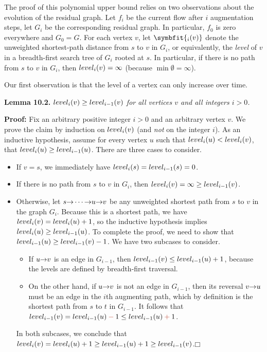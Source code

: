 The proof of this polynomial upper bound relies on two observations about the evolution of the residual graph.
Let $f_i$ be the current flow after $i$ augmentation steps, let $G_i$ be the corresponding residual graph.
In particular, $f_0$ is zero everywhere and $G_0 = G$.
For each vertex $v$, let \textbf{}$\symbfit{{}_i(v)}$ denote the unweighted shortest-path distance from $s$ to $v$ in $G_i$, or equivalently, the \textit{level} of $v$ in a breadth-first search tree of $G_i$ rooted at $s$.
In particular, if there is no path from $s$ to $v$ in $G_i$, then $level_i(v) = \infty$ (because $\min \emptyset = \infty$).

Our first observation is that the level of a vertex can only increase over time.

\noindent\textbf{Lemma 10.2.} \textsl{$level_i(v) \ge level_{i-1}(v)$ for all vertices $v$ and all integers $i > 0$.}

\noindent\textbf{Proof:} Fix an arbitrary positive integer $i > 0$ and an arbitrary vertex $v$.
We prove the claim by induction on $level_i(v)$ (and \textit{not} on the integer $i$).
As an inductive hypothesis, assume for every vertex $u$ such that $level_i(u) < level_i(v)$, that $level_i(u) \ge level_{i-1}(u)$.
There are three cases to consider.
\begin{itemize}
\item If $v = s$, we immediately have $level_i(s) = level_{i-1}(s) = 0$.

\item If there is no path from $s$ to $v$ in $G_i$, then $level_i(v) = \infty \ge level_{i-1}(v)$.
\item Otherwise, let $s\mathord{\rightarrow}\cdots\mathord{\rightarrow}u\mathord{\rightarrow}v$ be any unweighted shortest path from $s$ to $v$ in the graph $G_i$.
Because this is a shortest path, we have $level_i(v) = level_i(u)+1$, so the inductive hypothesis implies $level_i(u) \ge level_{i-1}(u)$.
To complete the proof, we need to show that $level_{i-1}(u) \ge level_{i-1}(v) - 1$.
We have two subcases to consider.
\begin{itemize}
\item[--] If $u\mathord{\rightarrow}v$ is an edge in $G_{i-1}$, then $level_{i-1}(v) \le level_{i-1}(u) + 1$, because the levels are defined by breadth-first traversal.
\item[--] On the other hand, if $u\mathord{\rightarrow}v$ is not an edge in $G_{i-1}$, then its reversal $v\mathord{\rightarrow}u$ must be an edge in the $i$th augmenting path, which by definition is the shortest path from $s$ to $t$ in $G_{i-1}$.
It follows that $\Var{level}_{i-1}(v) = \Var{level}_{i-1}(u) \mathbin{\color{JEred}-} 1 \le \Var{level}_{i-1}(u) \mathbin{\color{JEred}+} 1$.
\end{itemize}

In both subcases, we conclude that $level_i(v) = level_i(u)+1 \ge level_{i-1}(u) + 1 \ge level_{i-1}(v)$.\hfill$\mdlgwhtsquare$
\end{itemize}

